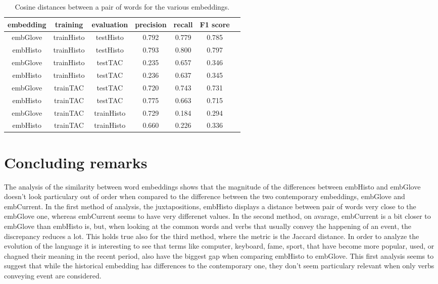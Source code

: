 \documentclass[runningheads]{llncs}
\begin{document}
\begin{table}
\centering
\caption{Cosine distances between a pair of words for the various embeddings.}
\label{tab:nnmodel}
\begin{tabular}{|c|c|c|c|c|c|c|}
\hline
{\bfseries embedding} & {\bfseries training} & {\bfseries evaluation} & {\bfseries precision} & {\bfseries recall} & {\bfseries F1 score}\\
\hline
embGlove &  trainHisto & testHisto & 0.792 & 0.779 & 0.785\\
embHisto &  trainHisto & testHisto & 0.793 & 0.800 & 0.797\\
embGlove &  trainHisto & testTAC & 0.235 & 0.657 & 0.346\\
embHisto &  trainHisto & testTAC & 0.236 & 0.637 & 0.345\\
embGlove &  trainTAC & testTAC & 0.720 & 0.743 & 0.731\\
embHisto &  trainTAC & testTAC & 0.775 & 0.663 & 0.715\\
embGlove &  trainTAC & trainHisto & 0.729 & 0.184 & 0.294\\
embHisto &  trainTAC & trainHisto & 0.660 & 0.226 & 0.336\\
\hline
\end{tabular}
\end{table}

\section{Concluding remarks}

The analysis of the similarity between word embeddings shows that the magnitude of the differences between embHisto and embGlove doesn't look particulary out of order when compared to the difference between the two contemporary embeddings, embGlove and embCurrent. In the first method of analysis, the juxtapositions, embHisto displays a distance between pair of words very close to the embGlove one, whereas embCurrent seems to have very differenet values. In the second method, on avarage, embCurrent is a bit closer to embGlove than embHisto is, but, when looking at the common words and verbs that usually convey the happening of an event, the discrepancy reduces a lot. This holds true also for the third method, where the metric is the Jaccard distance. In order to analyze the evolution of the language it is interesting to see that terms like computer, keyboard, fame, sport, that have become more popular, used, or chagned their meaning in the recent period, also have the biggest gap when comparing embHisto to embGlove. This first analysis seems to suggest that while the historical embedding has differences to the contemporary one, they don't seem particulary relevant when only verbs conveying event are considered.
\end{document}
